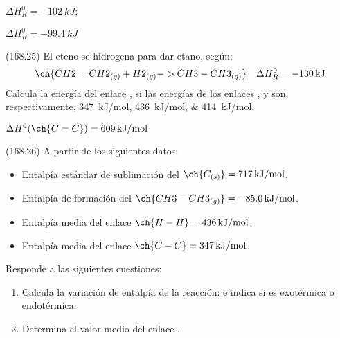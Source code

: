   \begin{solution}
    \begin{enumerate*}
      \item \( \Delta H^0_R = \SI{-102}{kJ} \); \item \( \Delta H^0_R = \SI{-99.4}{kJ} \)
    \end{enumerate*}
  \end{solution}




  \begin{exercise}[
      tags    = {},
      topics  = {química, termodinámica, termoquímica},
      source  = {FQ 1B MGH 2016, p168, e25},
    ]
    (168.25) El eteno se hidrogena para dar etano, según:
    \[ \ch{CH2=CH2_{(g)} + H2_{(g)} -> CH3-CH3_{(g)}} \quad \Delta H^0_R = \SI{-130}{kJ} \]
    Calcula la energía del enlace , si las energías de los
    enlaces ,  y  son, respectivamente, \SIlist{347;436;414}{kJ/mol}.
  \end{exercise}

  \begin{solution}
    \( \Delta H^0 (\ch{C=C}) = \SI{609}{kJ/mol} \)
  \end{solution}





  \begin{exercise}[
      tags    = {},
      topics  = {química, termodinámica, termoquímica},
      source  = {FQ 1B MGH 2016, p168, e26},
    ]
    (168.26) A partir de los siguientes datos:
    \begin{itemize}
      \item Entalpía estándar de sublimación del \( \ch{C_{(s)}} = \SI{717}{kJ/mol} \).
      \item Entalpía de formación del \( \ch{CH3-CH3_{(g)}} = \SI{-85,0}{kJ/mol} \).
      \item Entalpía media del enlace \( \ch{H-H} = \SI{436}{kJ/mol} \).
      \item Entalpía media del enlace \( \ch{C-C} = \SI{347}{kJ/mol} \).
    \end{itemize}
    Responde a las siguientes cuestiones: %
    \begin{enumerate}
      \item Calcula la variación de entalpía de la reacción:
       e indica si es exotérmica
      o endotérmica.
      \item Determina el valor medio del enlace .
    \end{enumerate}
  \end{exercise}

